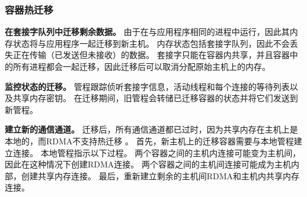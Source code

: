 

\subsubsection{容器热迁移}
\label{socksdirect:subsubsec:container_live_migration}


\textbf {在套接字队列中迁移剩余数据。}
由于\libipc {}在与应用程序相同的进程中运行，因此其内存状态将与应用程序一起迁移到新主机。
内存状态包括套接字队列，因此不会丢失正在传输（已发送但未接收）的数据。
套接字只能在容器内共享，并且容器中的所有进程都会一起迁移，因此迁移后可以取消分配原始主机上的内存。

\textbf {监控状态的迁移。}
管程跟踪侦听套接字信息，活动线程和每个连接的等待列表以及共享内存密钥。
在迁移期间，旧管程会转储已迁移容器的状态并将它们发送到新管程。

\textbf {建立新的通信通道。}
迁移后，所有通信通道都已过时，因为共享内存在主机上是本地的，而RDMA不支持热迁移 \cite{nsdi19freeflow,slim}。
首先，新主机上的迁移容器需要与本地管程建立连接。
本地管程指示以下过程。
两个容器之间的主机内连接可能变为主机间，因此\libipc {}在这种情况下创建RDMA连接。
两个容器之间的主机间连接可能成为主机内部，\libipc {}创建共享内存连接。
最后，\libipc {}重新建立剩余的主机间RDMA和主机内共享内存连接。


%

